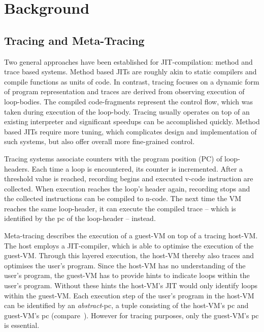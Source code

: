 \section{Background}

\subsection{Tracing and Meta-Tracing}

Two general approaches have been established for JIT-compilation: method and
trace based systems. Method based JITs are roughly akin to static compilers and compile
functions as units of code. In contrast, tracing focuses on a dynamic form of
program representation and traces are derived from observing execution of
loop-bodies. The compiled code-fragments represent the control flow, which was
taken during execution of the loop-body. Tracing usually operates on top of an
existing interpreter and significant speedups can be accomplished quickly.
Method based JITs require more tuning, which complicates design and
implementation of such systems, but also offer overall more fine-grained
control.

Tracing systems associate counters with the program position (PC) of
loop-headers. Each time a loop is encountered, its counter is incremented. After
a threshold value is reached, recording begins and executed v-code instruction
are collected. When execution reaches the loop's header again, recording stops
and the collected instructions can be compiled to n-code. The next time
the VM reaches the same loop-header, it can execute the compiled trace -- which
is identified by the pc of the loop-header -- instead.

Meta-tracing describes the execution of a guest-VM on top of a tracing
host-VM. The host employs a JIT-compiler, which is able to optimise the
execution of the guest-VM. Through this layered execution, the host-VM thereby also
traces and optimises the user's program. Since the host-VM has no understanding
of the user's program, the guest-VM has to provide hints to indicate loops
within the user's program. Without these hints the host-VM's JIT would only
identify loops within the guest-VM. Each execution step of the user's program in the
host-VM can be identified by an \emph{abstract}-pc, a tuple consisting of the
host-VM's pc and guest-VM's pc (compare~\cite{sullivan2003dynamic}). However for
tracing purposes, only the guest-VM's pc is essential.




